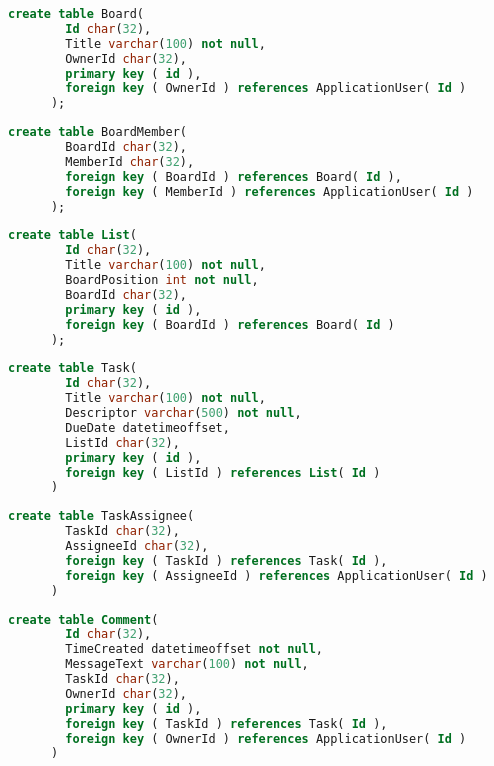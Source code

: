 \documentclass[letterpaper]{article}
\begin{document}
    \begin{lstlisting}[language=SQL, caption=Board Table Creation Statement]
      create table Board(
        Id char(32),
        Title varchar(100) not null,
        OwnerId char(32),
        primary key ( id ),
        foreign key ( OwnerId ) references ApplicationUser( Id )
      );
    \end{lstlisting}

    \begin{lstlisting}[language=SQL, caption=BoardMember Table Creation Statement]
      create table BoardMember(
        BoardId char(32),
        MemberId char(32),
        foreign key ( BoardId ) references Board( Id ),
        foreign key ( MemberId ) references ApplicationUser( Id )
      );
    \end{lstlisting}
    \begin{lstlisting}[language=SQL, caption=List Table Creation Statement]
      create table List(
        Id char(32),
        Title varchar(100) not null,
        BoardPosition int not null,
        BoardId char(32),
        primary key ( id ),
        foreign key ( BoardId ) references Board( Id )
      );
    \end{lstlisting}
    \begin{lstlisting}[language=SQL, caption=Task Table Creation Statement]
      create table Task(
        Id char(32),
        Title varchar(100) not null,
        Descriptor varchar(500) not null,
        DueDate datetimeoffset,
        ListId char(32),
        primary key ( id ),
        foreign key ( ListId ) references List( Id )
      )
    \end{lstlisting}
    \begin{lstlisting}[language=SQL, caption=TaskAssignee Table Creation Statement]
      create table TaskAssignee(
        TaskId char(32),
        AssigneeId char(32),
        foreign key ( TaskId ) references Task( Id ),
        foreign key ( AssigneeId ) references ApplicationUser( Id )
      )
    \end{lstlisting}
    \begin{lstlisting}[language=SQL, caption=Comment Table Creation Statement]
      create table Comment(
        Id char(32),
        TimeCreated datetimeoffset not null,
        MessageText varchar(100) not null,
        TaskId char(32),
        OwnerId char(32),
        primary key ( id ),
        foreign key ( TaskId ) references Task( Id ),
        foreign key ( OwnerId ) references ApplicationUser( Id )
      )
    \end{lstlisting}
\end{document}
